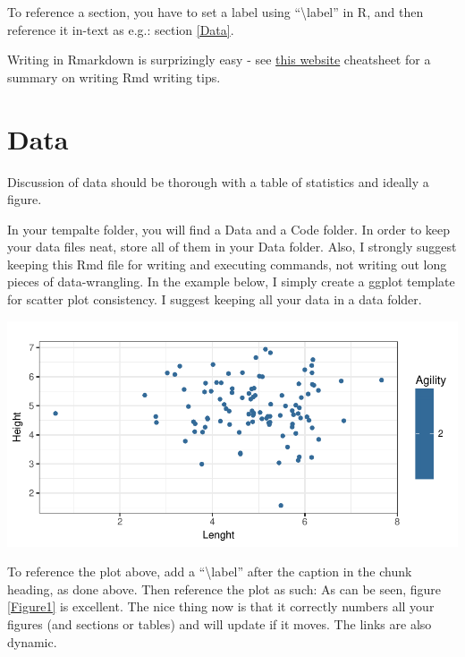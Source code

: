 \documentclass[12pt,a4paper]{article}
\numberwithin{equation}{section}
\numberwithin{figure}{section}
\numberwithin{table}{section}
\let\origfigure\figure
\let\endorigfigure\endfigure
\renewenvironment{figure}[1][2] {
    \expandafter\origfigure\expandafter[H]
} {
    \endorigfigure
}
\begin{document}
To reference a section, you have to set a label using
``\textbackslash{}label'' in R, and then reference it in-text as e.g.:
section \ref{Data}.

Writing in Rmarkdown is surprizingly easy - see
\href{https://www.rstudio.com/wp-content/uploads/2015/03/rmarkdown-reference.pdf}{this
website} cheatsheet for a summary on writing Rmd writing tips.

\section{\texorpdfstring{Data \label{Data}}{Data }}\label{data}

Discussion of data should be thorough with a table of statistics and
ideally a figure.

In your tempalte folder, you will find a Data and a Code folder. In
order to keep your data files neat, store all of them in your Data
folder. Also, I strongly suggest keeping this Rmd file for writing and
executing commands, not writing out long pieces of data-wrangling. In
the example below, I simply create a ggplot template for scatter plot
consistency. I suggest keeping all your data in a data folder.

\begin{figure}[H]

{\centering \includegraphics{Template_files/figure-latex/Figure1-1} 

}

\caption{Caption Here \label{Figure1}}\label{fig:Figure1}
\end{figure}

To reference the plot above, add a ``\textbackslash{}label'' after the
caption in the chunk heading, as done above. Then reference the plot as
such: As can be seen, figure \ref{Figure1} is excellent. The nice thing
now is that it correctly numbers all your figures (and sections or
tables) and will update if it moves. The links are also dynamic.
\end{document}
